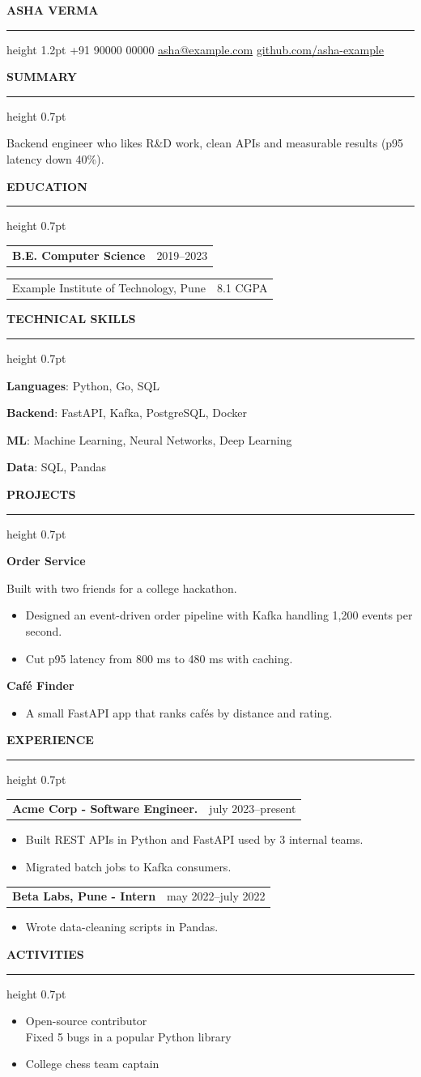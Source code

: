 \documentclass[11pt,letterpaper]{article}
\makeatletter
\newcommand{\resumesection}[1]{%
  \par\vspace{7pt}%
  {\fontfamily{phv}\selectfont\bfseries\fontsize{10.8}{11.5}\selectfont
   \MakeUppercase{#1}}\par
  \vspace{2pt}%
  \hrule height 0.7pt
  \vspace{3pt}%
}
\newcommand{\datedrow}[2]{%
  \begin{tabularx}{\textwidth}{@{}Xr@{}}
    #1 & #2
  \end{tabularx}\vspace{-1pt}%
}
\newcommand{\skill}[2]{\textbf{#1}: #2\par}
\makeatother
\begin{document}
\begin{center}
  {\selectfont\bfseries\fontsize{25}{27}\selectfont ASHA VERMA}\par
  \vspace{2pt}\hrule height 1.2pt\vspace{4pt}
  {\fontsize{10.5}{12}\selectfont
    +91 90000 00000 \enspace\textbullet\enspace
    \href{mailto:asha@example.com}{asha@example.com}\enspace\textbullet\enspace
    \href{https://github.com/asha-example}{\underline{github.com/asha-example}}
  }
\end{center}
\vspace{-3pt}

\resumesection{Summary}
{\fontsize{11}{13.5}\selectfont
Backend engineer who likes R\&D work, clean APIs and measurable results (p95 latency down 40\%).\par}

\resumesection{Education}
\datedrow{\textbf{B.E. Computer Science}}{2019--2023}
\datedrow{Example Institute of Technology, Pune}{8.1 CGPA}

\resumesection{Technical Skills}
\skill{Languages}{Python, Go, SQL}
\skill{Backend}{FastAPI, Kafka, PostgreSQL, Docker}
\skill{ML}{Machine Learning, Neural Networks, Deep Learning}
\skill{Data}{SQL, Pandas}

\resumesection{Projects}
\textbf{Order Service}\par
\hspace{1.25em}Built with two friends for a college hackathon.\par
\begin{itemize}
  \item Designed an event-driven order pipeline with Kafka handling 1,200 events per second.
  \item Cut p95 latency from 800 ms to 480 ms with caching.
\end{itemize}
\vspace{2pt}
\textbf{Caf\'{e} Finder}\par
\begin{itemize}
  \item A small FastAPI app that ranks caf\'{e}s by distance and rating.
\end{itemize}

\resumesection{Experience}
\datedrow{\selectfont\bfseries Acme Corp - Software Engineer.}{july 2023--present}
\begin{itemize}
  \item Built REST APIs in Python and FastAPI used by 3 internal teams.
  \item Migrated batch jobs to Kafka consumers.
\end{itemize}
\datedrow{\fontfamily{phv}\selectfont\bfseries Beta Labs, Pune - Intern}{may 2022--july 2022}
\begin{itemize}
  \item Wrote data-cleaning scripts in Pandas.
\end{itemize}

\resumesection{Activities}
\begin{itemize}
  \item Open-source contributor\\
        \hspace{0.35em}Fixed 5 bugs in a popular Python library
  \item College chess team captain
\end{itemize}
\end{document}
